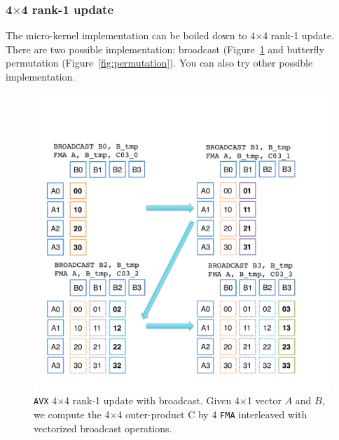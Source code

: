 \subsubsection{4$\times$4 rank-1 update}
The micro-kernel implementation can be boiled down to 4$\times$4 rank-1 update. There are two possible implementation: broadcast (Figure~\ref{fig:broadcast} and butterfly permutation (Figure~\ref{fig:permutation}). You can also try other possible implementation.
\begin{figure}
\begin{center}
	\includegraphics[width=5in]{figures/avx_broadcast.pdf}
\end{center}
\caption{{\tt AVX} 4$\times$4 rank-1 update with broadcast. Given 4$\times$1 vector $A$ and $B$, we compute the 4$\times$4 outer-product C by 4 {\tt FMA} interleaved with vectorized broadcast operations.}
\label{fig:broadcast}
\end{figure}

